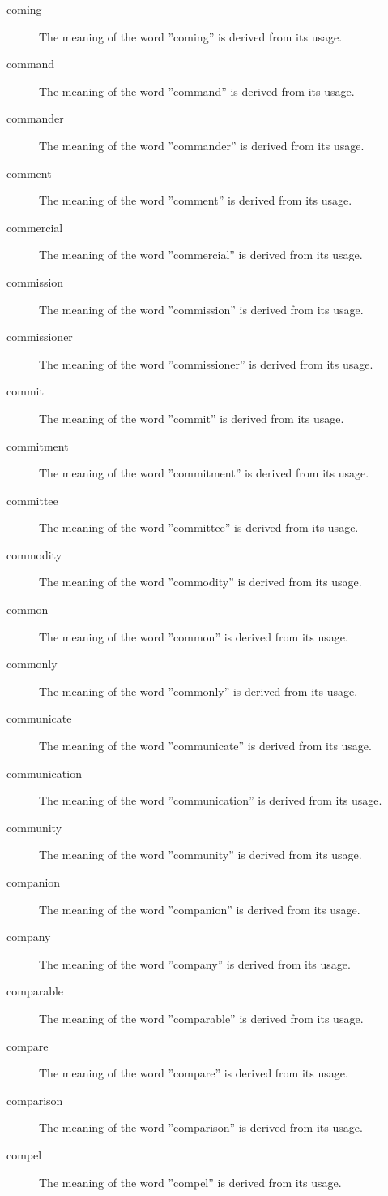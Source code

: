 \documentclass[12pt, letterpaper]{memoir}
\begin{document}
\begin{description}
\item[coming] The meaning of the word ''coming'' is derived from its usage.
\item[command] The meaning of the word ''command'' is derived from its usage.
\item[commander] The meaning of the word ''commander'' is derived from its usage.
\item[comment] The meaning of the word ''comment'' is derived from its usage.
\item[commercial] The meaning of the word ''commercial'' is derived from its usage.
\item[commission] The meaning of the word ''commission'' is derived from its usage.
\item[commissioner] The meaning of the word ''commissioner'' is derived from its usage.
\item[commit] The meaning of the word ''commit'' is derived from its usage.
\item[commitment] The meaning of the word ''commitment'' is derived from its usage.
\item[committee] The meaning of the word ''committee'' is derived from its usage.
\item[commodity] The meaning of the word ''commodity'' is derived from its usage.
\item[common] The meaning of the word ''common'' is derived from its usage.
\item[commonly] The meaning of the word ''commonly'' is derived from its usage.
\item[communicate] The meaning of the word ''communicate'' is derived from its usage.
\item[communication] The meaning of the word ''communication'' is derived from its usage.
\item[community] The meaning of the word ''community'' is derived from its usage.
\item[companion] The meaning of the word ''companion'' is derived from its usage.
\item[company] The meaning of the word ''company'' is derived from its usage.
\item[comparable] The meaning of the word ''comparable'' is derived from its usage.
\item[compare] The meaning of the word ''compare'' is derived from its usage.
\item[comparison] The meaning of the word ''comparison'' is derived from its usage.
\item[compel] The meaning of the word ''compel'' is derived from its usage.

\end{description}
\end{document}
